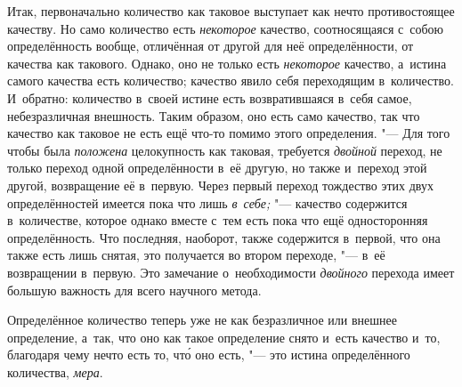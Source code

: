 Итак, первоначально количество как таковое выступает как нечто противостоящее
качеству. Но само количество есть {\em некоторое} качество, соотносящаяся
с~собою определённость вообще, отличённая от другой для неё определённости,
от качества как такового. Однако, оно не только есть {\em некоторое} качество,
а~истина самого качества есть количество; качество явило себя переходящим
в~количество. И~обратно: количество в~своей истине есть возвратившаяся в~себя
самое, небезразличная внешность. Таким образом, оно есть само качество, так что
качество как таковое не есть ещё что-то помимо этого определения. "--- Для того
чтобы была {\em положена} целокупность как таковая, требуется {\em двойной}
переход, не только переход одной определённости в~её другую, но также и~переход
этой другой, возвращение её в~первую. Через первый переход тождество этих двух
определённостей имеется пока что лишь {\em в~себе;} "--- качество содержится
в~количестве, которое однако вместе с~тем есть пока что ещё односторонняя
определённость. Что последняя, наоборот, также содержится в~первой, что она
также есть лишь снятая, это получается во втором переходе, "--- в~её
возвращении в~первую. Это замечание о~необходимости {\em двойного} перехода
имеет большую важность для всего научного метода.

Определённое количество теперь уже не как безразличное или внешнее определение,
а~так, что оно как такое определение снято и~есть качество и~то, благодаря чему
нечто есть то, чт\'{о} оно есть, "--- это истина определённого количества,
{\em мера}.

\subsubsection[Примечание]{}


